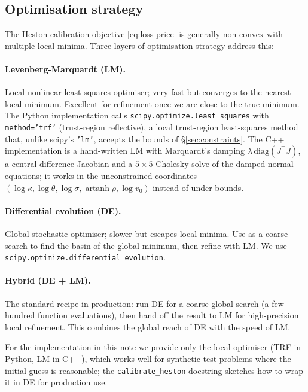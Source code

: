 \documentclass[11pt]{article}
\theoremstyle{plain}
\theoremstyle{definition}
\theoremstyle{remark}
\begin{document}
\subsection{Optimisation strategy}
\label{sec:optimisation}

The Heston calibration objective \eqref{eq:loss-price} is generally non-convex with multiple local minima. Three layers of optimisation strategy address this:

\paragraph{Levenberg-Marquardt (LM).} Local nonlinear least-squares optimiser; very fast but converges to the nearest local minimum. Excellent for refinement once we are close to the true minimum. The Python implementation calls \texttt{scipy.optimize.least\_squares} with \texttt{method='trf'} (trust-region reflective), a local trust-region least-squares method that, unlike scipy's \texttt{'lm'}, accepts the bounds of \S\ref{sec:constraints}. The C++ implementation is a hand-written LM with Marquardt's damping $\lambda\,\mathrm{diag}(J^\top J)$, a central-difference Jacobian and a $5 \times 5$ Cholesky solve of the damped normal equations; it works in the unconstrained coordinates $(\log\kappa, \log\theta, \log\sigma, \operatorname{artanh}\rho, \log v_0)$ instead of under bounds.

\paragraph{Differential evolution (DE).} Global stochastic optimiser; slower but escapes local minima. Use as a coarse search to find the basin of the global minimum, then refine with LM. We use \texttt{scipy.optimize.differential\_evolution}.

\paragraph{Hybrid (DE + LM).} The standard recipe in production: run DE for a coarse global search (a few hundred function evaluations), then hand off the result to LM for high-precision local refinement. This combines the global reach of DE with the speed of LM.

For the implementation in this note we provide only the local optimiser (TRF in Python, LM in C++), which works well for synthetic test problems where the initial guess is reasonable; the \texttt{calibrate\_heston} docstring sketches how to wrap it in DE for production use.
\end{document}

